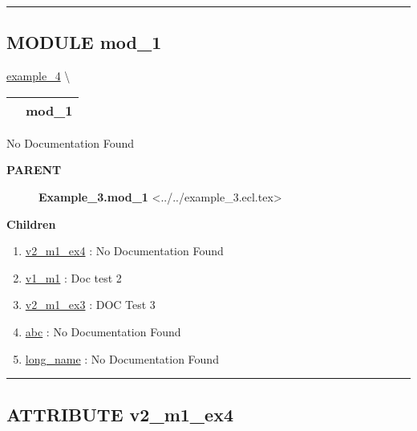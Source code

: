 \rule{\linewidth}{0.5pt}

\subsection*{\textsf{\colorbox{headtoc}{\color{white} MODULE}
mod\_1}}

\hypertarget{ecldoc:intest.inintest.example_4.mod_1}{}
\hspace{0pt} \hyperlink{ecldoc:intest.inintest.example_4}{example_4} \textbackslash 

{\renewcommand{\arraystretch}{1.5}
\begin{tabularx}{\textwidth}{|>{\raggedright\arraybackslash}l|X|}
\hline
\hspace{0pt}\mytexttt{\color{red} } & \textbf{mod\_1} \\
\hline
\end{tabularx}
}

\par





No Documentation Found










\par
\begin{description}
\item [\colorbox{tagtype}{\color{white} \textbf{\textsf{PARENT}}}] \textbf{Example\_3.mod\_1} <../../example\_3.ecl.tex>
\end{description}


\textbf{Children}
\begin{enumerate}
\item \hyperlink{ecldoc:intest.inintest.example_4.mod_1.v2_m1_ex4}{v2\_m1\_ex4}
: No Documentation Found
\item \hyperlink{ecldoc:example_3.mod_1.v1_m1}{v1\_m1}
: Doc test 2
\item \hyperlink{ecldoc:example_3.mod_1.v2_m1_ex3}{v2\_m1\_ex3}
: DOC Test 3
\item \hyperlink{ecldoc:example_3.mod_1.abc}{abc}
: No Documentation Found
\item \hyperlink{ecldoc:example_3.mod_1.long_name}{long\_name}
: No Documentation Found
\end{enumerate}

\rule{\linewidth}{0.5pt}

\subsection*{\textsf{\colorbox{headtoc}{\color{white} ATTRIBUTE}
v2\_m1\_ex4}}

